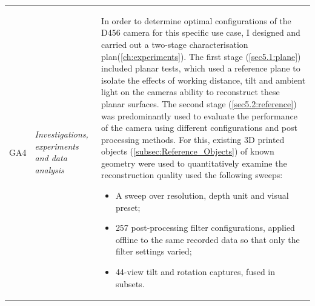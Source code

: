 {\begin{longtable}{>{\raggedright\arraybackslash}p{} >{\raggedright\arraybackslash}p{} >{\noindent\justifying\arraybackslash}p{}}
		
		\cmidrule(lr){1-3}
		
		GA4 & \textit{Investigations, experiments and data analysis} &
		In order to determine optimal configurations of the D456 camera for this specific use case, I designed and carried out a two-stage characterisation plan(\autoref{ch:experiments}). The first stage (\autoref{sec5.1:plane}) included planar tests, which used a reference plane to isolate the effects of working distance, tilt and ambient light on the cameras ability to reconstruct these planar surfaces. The second stage (\autoref{sec5.2:reference}) was predominantly used to evaluate the performance of the camera using different configurations and post processing methods. For this, existing 3D printed objects (\autoref{subsec:Reference_Objects}) of known geometry were used to quantitatively examine the reconstruction quality used the following sweeps:
		\begin{itemize}
			\item A sweep over resolution, depth unit and visual preset;
			\item 257 post-processing filter configurations, applied offline to the same recorded data so that only the filter settings varied;
			\item 44-view tilt and rotation captures, fused in subsets.
		\end{itemize}
		

\end{longtable}}
